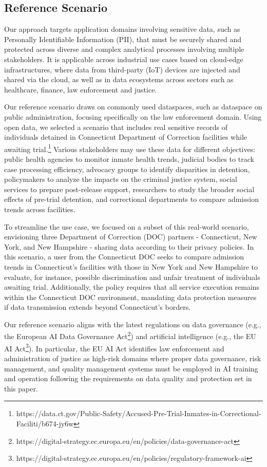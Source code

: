 \subsection{Reference Scenario}\label{sec:service_definition}

{\color{OurColor}
Our approach targets application domains involving sensitive data, such as Personally Identifiable Information (PII), that must be securely shared and protected across diverse and complex analytical processes involving multiple stakeholders. It is applicable across industrial use cases based on cloud-edge infrastructures, where data from third-party (IoT) devices are injected and shared via the cloud, as well as in data ecosystems across sectors such as healthcare, finance, law enforcement and justice.

Our reference scenario draws on commonly used dataspaces, such as dataspace on public administration, focusing specifically on the law enforcement domain. Using open data, we selected a scenario that includes real sensitive records of individuals detained in Connecticut Department of Correction facilities while awaiting trial.\footnote{https://data.ct.gov/Public-Safety/Accused-Pre-Trial-Inmates-in-Correctional-Faciliti/b674-jy6w} Various stakeholders may use these data for different objectives: public health agencies to monitor inmate health trends, judicial bodies to track case processing efficiency, advocacy groups to identify disparities in detention, policymakers to analyze the impacts on the criminal justice system, social services to prepare post-release support, researchers to study the broader social effects of pre-trial detention, and correctional departments to compare admission trends across facilities.

To streamline the use case, we focused on a subset of this real-world scenario, envisioning three Department of Correction (DOC) partners - Connecticut, New York, and New Hampshire - sharing data according to their privacy policies. In this scenario, a user from the Connecticut DOC seeks to compare admission trends in Connecticut’s facilities with those in New York and New Hampshire to evaluate, for instance, possible discrimination and unfair treatment of individuals awaiting trial. Additionally, the policy requires that all service execution remains within the Connecticut DOC environment, mandating data protection measures if data transmission extends beyond Connecticut’s borders.

Our reference scenario aligns with the latest regulations on data governance (e.g., the European AI Data Governance Act\footnote{https://digital-strategy.ec.europa.eu/en/policies/data-governance-act}) and artificial intelligence (e.g., the EU AI Act\footnote{https://digital-strategy.ec.europa.eu/en/policies/regulatory-framework-ai}). In particular, the EU AI Act identifies law enforcement and administration of justice as high-risk domains where proper data governance, risk management, and quality management systems must be employed in AI training and operation following the requirements on data quality and protection set in this paper.}

